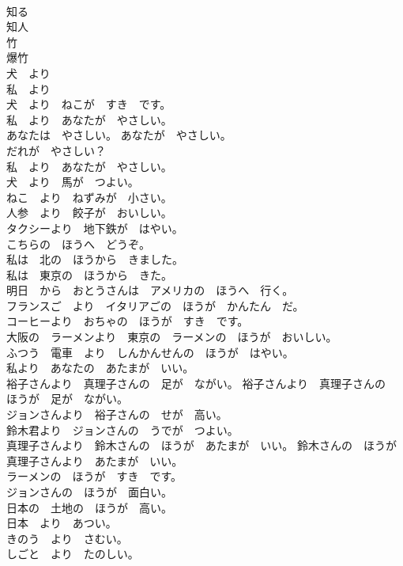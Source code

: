 \documentclass[8pt]{extreport}
\begin{document}
\begin{CJK}{UTF8}{min}
\\	知る	
\\	知人	
\\	竹	
\\	爆竹	
\\	犬　より	
\\	私　より	
\\	犬　より　ねこが　すき　です。	
\\	私　より　あなたが　やさしい。	
\\	あなたは　やさしい。 あなたが　やさしい。	
\\	だれが　やさしい？	
\\	私　より　あなたが　やさしい。	
\\	犬　より　馬が　つよい。	
\\	ねこ　より　ねずみが　小さい。	
\\	人参　より　餃子が　おいしい。	
\\	タクシーより　地下鉄が　はやい。	
\\	こちらの　ほうへ　どうぞ。	
\\	私は　北の　ほうから　きました。	
\\	私は　東京の　ほうから　きた。	
\\	明日　から　おとうさんは　アメリカの　ほうへ　行く。	
\\	フランスご　より　イタリアごの　ほうが　かんたん　だ。	
\\	コーヒーより　おちゃの　ほうが　すき　です。	
\\	大阪の　ラーメンより　東京の　ラーメンの　ほうが　おいしい。	
\\	ふつう　電車　より　しんかんせんの　ほうが　はやい。	
\\	私より　あなたの　あたまが　いい。	
\\	裕子さんより　真理子さんの　足が　ながい。 裕子さんより　真理子さんの　ほうが　足が　ながい。	
\\	ジョンさんより　裕子さんの　せが　高い。	
\\	鈴木君より　ジョンさんの　うでが　つよい。	
\\	真理子さんより　鈴木さんの　ほうが　あたまが　いい。 鈴木さんの　ほうが　真理子さんより　あたまが　いい。	
\\	ラーメンの　ほうが　すき　です。	
\\	ジョンさんの　ほうが　面白い。	
\\	日本の　土地の　ほうが　高い。	
\\	日本　より　あつい。	
\\	きのう　より　さむい。	
\\	しごと　より　たのしい。	

\end{CJK}
\end{document}
